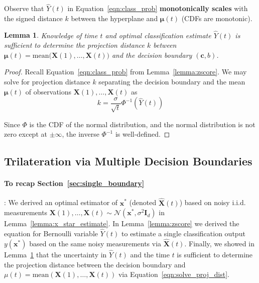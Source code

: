 \documentclass[12pt]{article}
\newtheorem{lemma}{Lemma}
\begin{document}
Observe that $\hat Y(t)$ in Equation~\ref{eqn:class_prob} \textbf{monotonically scales} with the signed distance $k$ between the hyperplane and $\mathbf \mu(t)$ (CDFs are monotonic). 

\begin{lemma}
	\label{lemma:prob_to_dist}
	Knowledge of time $t$ and optimal classification estimate $\hat Y(t)$ is sufficient to determine the projection distance $k$ between $\mathbf \mu(t) = \text{mean}\big(\mathbf X(1), \dots, \mathbf X(t)\big)$ and the decision boundary $(\mathbf c, b)$. 
\end{lemma}
\begin{proof}
	Recall Equation~\ref{eqn:class_prob} from Lemma~\ref{lemma:zscore}. 
	We may solve for projection distance $k$ separating the decision boundary and the mean $\mathbf \mu(t)$ of observations $\mathbf X(1), \dots, \mathbf X(t)$ as 
	\begin{equation}
		\label{eqn:solve_proj_dist}
		k = \frac{\sigma}{\sqrt t}\Phi^{-1}(\hat Y(t))
	\end{equation}

	Since $\Phi$ is the CDF of the normal distribution, and the normal distribution is not zero except at $\pm \infty$, the inverse $\Phi^{-1}$ is well-defined.
\end{proof}


\subsection{Trilateration via Multiple Decision Boundaries}

\paragraph{To recap Section~\ref{sec:single_boundary}}: We derived an optimal estimator of $\mathbf x^*$ (denoted $\hat{\mathbf X}(t)$) based on noisy i.i.d. measurements $\mathbf X(1), \dots, \mathbf X(t) \sim \mathcal N(\mathbf x^*, \sigma^2 \mathbf I_d)$ in Lemma~\ref{lemma:x_star_estimate}. 
In Lemma~\ref{lemma:zscore} we derived the equation for Bernoulli variable $\hat{Y}(t)$ to estimate a single classification output $y(\mathbf x^*)$ based on the same noisy measurements via $\hat{\mathbf X}(t)$.
Finally, we showed in Lemma~\ref{lemma:prob_to_dist} that the uncertainty in $\hat{Y}(t)$ and the time $t$ is sufficient to determine the projection distance between the decision boundary and $\mu(t) = \text{mean}(\mathbf X(1), \dots, \mathbf X(t))$ via Equation~\ref{eqn:solve_proj_dist}. \\
\end{document}
